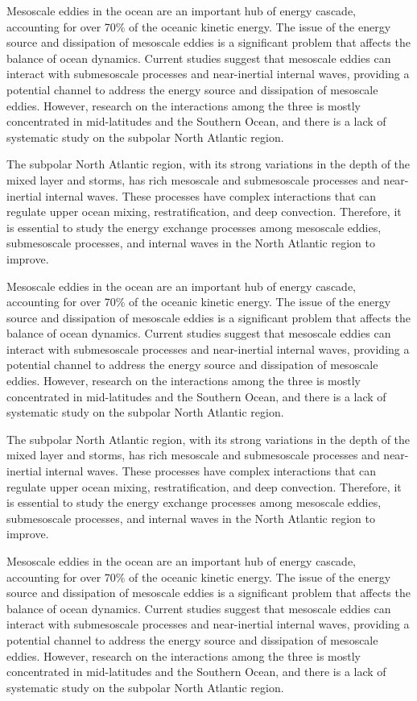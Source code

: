\begin{enabstract}

Mesoscale eddies in the ocean are an important hub of energy cascade, accounting for over 70\% of the oceanic kinetic energy. The issue of the energy source and dissipation of mesoscale eddies is a significant problem that affects the balance of ocean dynamics. Current studies suggest that mesoscale eddies can interact with submesoscale processes and near-inertial internal waves, providing a potential channel to address the energy source and dissipation of mesoscale eddies. However, research on the interactions among the three is mostly concentrated in mid-latitudes and the Southern Ocean, and there is a lack of systematic study on the subpolar North Atlantic region.

The subpolar North Atlantic region, with its strong variations in the depth of the mixed layer and storms, has rich mesoscale and submesoscale processes and near-inertial internal waves. These processes have complex interactions that can regulate upper ocean mixing, restratification, and deep convection. Therefore, it is essential to study the energy exchange processes among mesoscale eddies, submesoscale processes, and internal waves in the North Atlantic region to improve.

Mesoscale eddies in the ocean are an important hub of energy cascade, accounting for over 70\% of the oceanic kinetic energy. The issue of the energy source and dissipation of mesoscale eddies is a significant problem that affects the balance of ocean dynamics. Current studies suggest that mesoscale eddies can interact with submesoscale processes and near-inertial internal waves, providing a potential channel to address the energy source and dissipation of mesoscale eddies. However, research on the interactions among the three is mostly concentrated in mid-latitudes and the Southern Ocean, and there is a lack of systematic study on the subpolar North Atlantic region.

The subpolar North Atlantic region, with its strong variations in the depth of the mixed layer and storms, has rich mesoscale and submesoscale processes and near-inertial internal waves. These processes have complex interactions that can regulate upper ocean mixing, restratification, and deep convection. Therefore, it is essential to study the energy exchange processes among mesoscale eddies, submesoscale processes, and internal waves in the North Atlantic region to improve.

Mesoscale eddies in the ocean are an important hub of energy cascade, accounting for over 70\% of the oceanic kinetic energy. The issue of the energy source and dissipation of mesoscale eddies is a significant problem that affects the balance of ocean dynamics. Current studies suggest that mesoscale eddies can interact with submesoscale processes and near-inertial internal waves, providing a potential channel to address the energy source and dissipation of mesoscale eddies. However, research on the interactions among the three is mostly concentrated in mid-latitudes and the Southern Ocean, and there is a lack of systematic study on the subpolar North Atlantic region.


\end{enabstract}
